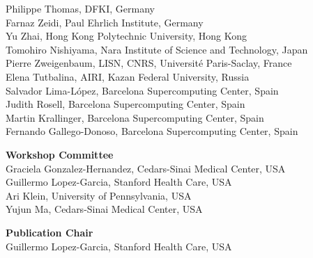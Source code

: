 \documentclass[11pt,oneside]{book}
\begin{document}
\begin{description}
      Philippe Thomas, DFKI, Germany\\
      Farnaz Zeidi, Paul Ehrlich Institute, Germany\\
      Yu Zhai, Hong Kong Polytechnic University, Hong Kong\\
      Tomohiro Nishiyama, Nara Institute of Science and Technology, Japan\\
      Pierre Zweigenbaum, LISN, CNRS, Université Paris-Saclay, France\\
      Elena Tutbalina, AIRI, Kazan Federal University, Russia\\
      Salvador Lima-López, Barcelona Supercomputing Center, Spain\\
      Judith Rosell, Barcelona Supercomputing Center, Spain\\
      Martin Krallinger, Barcelona Supercomputing Center, Spain\\
      Fernando Gallego-Donoso, Barcelona Supercomputing Center, Spain\\
    \item{\bf Workshop Committee}\vspace{2mm}\\
      Graciela Gonzalez-Hernandez, Cedars-Sinai Medical Center, USA\\
      Guillermo Lopez-Garcia, Stanford Health Care, USA\\
      Ari Klein, University of Pennsylvania, USA\\
      Yujun Ma, Cedars-Sinai Medical Center, USA\\
    \item{\bf Publication Chair}\vspace{2mm}\\
      Guillermo Lopez-Garcia, Stanford Health Care, USA\\
  \end{description}
\newpage
\end{document}
